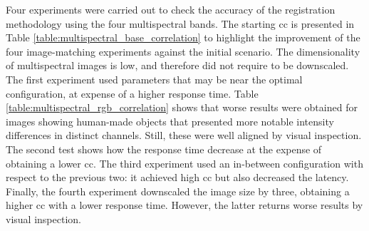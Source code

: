 Four experiments were carried out to check the accuracy of the registration methodology using the four multispectral bands. The starting \acrshort{cc} is presented in Table \ref{table:multispectral_base_correlation} to highlight the improvement of the four image-matching experiments against the initial scenario. The dimensionality of multispectral images is low, and therefore did not require to be downscaled. The first experiment used parameters that may be near the optimal configuration, at expense of a higher response time. Table \ref{table:multispectral_rgb_correlation} shows that worse results were obtained for images showing human-made objects that presented more notable intensity differences in distinct channels. Still, these were well aligned by visual inspection. The second test shows how the response time decrease at the expense of obtaining a lower \acrshort{cc}. The third experiment used an in-between configuration with respect to the previous two: it achieved high \acrshort{cc} but also decreased the latency. Finally, the fourth experiment downscaled the image size by three, obtaining a higher \acrshort{cc} with a lower response time. However, the latter returns worse results by visual inspection.

